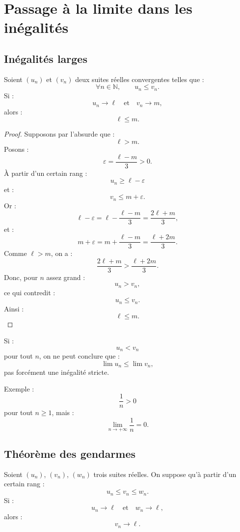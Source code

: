 \documentclass[11pt,a4paper]{article}
\newcommand{\N}{\mathbb N}
\begin{document}
\section{Passage à la limite dans les inégalités}

\subsection{Inégalités larges}

\begin{theorembox}
Soient \((u_n)\) et \((v_n)\) deux suites réelles convergentes telles que :
\[
\forall n\in\N,\qquad u_n\leq v_n.
\]
Si :
\[
u_n\to\ell
\quad\text{et}\quad
v_n\to m,
\]
alors :
\[
\ell\leq m.
\]
\end{theorembox}

\begin{proof}
Supposons par l'absurde que :
\[
\ell>m.
\]
Posons :
\[
\varepsilon=\frac{\ell-m}{3}>0.
\]
À partir d'un certain rang :
\[
u_n\geq \ell-\varepsilon
\]
et :
\[
v_n\leq m+\varepsilon.
\]
Or :
\[
\ell-\varepsilon
=
\ell-\frac{\ell-m}{3}
=
\frac{2\ell+m}{3},
\]
et :
\[
m+\varepsilon
=
m+\frac{\ell-m}{3}
=
\frac{\ell+2m}{3}.
\]
Comme \(\ell>m\), on a :
\[
\frac{2\ell+m}{3}>\frac{\ell+2m}{3}.
\]
Donc, pour \(n\) assez grand :
\[
u_n>v_n,
\]
ce qui contredit :
\[
u_n\leq v_n.
\]
Ainsi :
\[
\ell\leq m.
\]
\end{proof}

\begin{erreurbox}
Si :
\[
u_n<v_n
\]
pour tout \(n\), on ne peut conclure que :
\[
\lim u_n\leq \lim v_n,
\]
pas forcément une inégalité stricte.

Exemple :
\[
\frac1n>0
\]
pour tout \(n\geq1\), mais :
\[
\lim_{n\to+\infty}\frac1n=0.
\]
\end{erreurbox}

\subsection{Théorème des gendarmes}

\begin{theorembox}
Soient \((u_n)\), \((v_n)\), \((w_n)\) trois suites réelles.  
On suppose qu'à partir d'un certain rang :
\[
u_n\leq v_n\leq w_n.
\]
Si :
\[
u_n\to \ell
\quad\text{et}\quad
w_n\to \ell,
\]
alors :
\[
v_n\to \ell.
\]
\end{theorembox}
\end{document}
